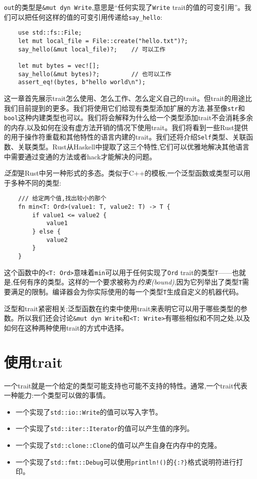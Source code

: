 \texttt{out}的类型是\texttt{\&mut dyn Write},意思是“任何实现了\texttt{Write} trait的值的可变引用”。我们可以把任何这样的值的可变引用传递给\texttt{say\_hello}:
\begin{verbatim}
    use std::fs::File;
    let mut local_file = File::create("hello.txt")?;
    say_hello(&mut local_file)?;    // 可以工作

    let mut bytes = vec![];
    say_hello(&mut bytes)?;         // 也可以工作
    assert_eq!(bytes, b"hello world\n");
\end{verbatim}

这一章首先展示trait怎么使用、怎么工作、怎么定义自己的trait。但trait的用途比我们目前提到的更多。我们将使用它们给现有类型添加扩展的方法,甚至像\texttt{str}和\texttt{bool}这种内建类型也可以。我们将会解释为什么给一个类型添加trait不会消耗多余的内存,以及如何在没有虚方法开销的情况下使用trait。我们将看到一些Rust提供的用于操作符重载和其他特性的语言内建的trait。我们还将介绍\texttt{Self}类型、关联函数、关联类型。Rust从Haskell中提取了这三个特性,它们可以优雅地解决其他语言中需要通过变通的方法或者hack才能解决的问题。 

\emph{泛型}是Rust中另一种形式的多态。类似于C++的模板,一个泛型函数或类型可以用于多种不同的类型:
\begin{verbatim}
    /// 给定两个值,找出较小的那个
    fn min<T: Ord>(value1: T, value2: T) -> T {
        if value1 <= value2 {
            value1
        } else {
            value2
        }
    }
\end{verbatim}

这个函数中的\texttt{<T: Ord>}意味着\texttt{min}可以用于任何实现了\texttt{Ord} trait的类型\texttt{T}——也就是,任何有序的类型。这样的一个要求被称为\emph{约束(bound)},因为它列举出了类型\texttt{T}需要满足的限制。编译器会为你实际使用的每一个类型\texttt{T}生成自定义的机器代码。

泛型和trait紧密相关:泛型函数在约束中使用trait来表明它可以用于哪些类型的参数。所以我们还会讨论\texttt{\&mut dyn Write}和\texttt{<T: Write>}有哪些相似和不同之处,以及如何在这种两种使用trait的方式中选择。

\section{使用trait}

一个trait就是一个给定的类型可能支持也可能不支持的特性。通常,一个trait代表一种能力:一个类型可以做的事情。
\begin{itemize}
    \item 一个实现了\texttt{std::io::Write}的值可以写入字节。
    \item 一个实现了\texttt{std::iter::Iterator}的值可以产生值的序列。
    \item 一个实现了\texttt{std::clone::Clone}的值可以产生自身在内存中的克隆。
    \item 一个实现了\texttt{std::fmt::Debug}可以使用\texttt{println!()}的\texttt{\{:?\}}格式说明符进行打印。
\end{itemize}

